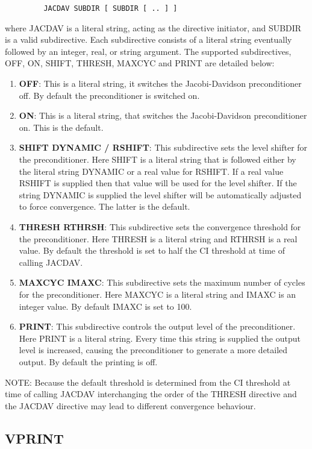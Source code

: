 \documentclass[11pt,fleqn]{article}
\begin{document}
{
\footnotesize
\begin{verbatim}
         JACDAV SUBDIR [ SUBDIR [ .. ] ]
\end{verbatim}
}
where JACDAV is a literal string, acting as the directive initiator,
and SUBDIR is a valid subdirective. Each subdirective consists of a 
literal string eventually followed by an integer, real, or string 
argument. The supported subdirectives, OFF, ON, SHIFT, THRESH, MAXCYC
and PRINT are detailed below:
\begin{enumerate}
\item  {\bf OFF}:
This is a literal string, it switches the Jacobi-Davidson preconditioner
off. By default the preconditioner is switched on. 
\item  {\bf ON}:
This is a literal string, that switches the Jacobi-Davidson
preconditioner on. This is the default. 
\item {\bf SHIFT DYNAMIC / RSHIFT}:
This subdirective sets the level shifter for the preconditioner. Here
SHIFT is a literal string that is followed either by the literal string
DYNAMIC or a real value for RSHIFT. If a real value RSHIFT is
supplied then that value will be used for the level shifter. If the string
DYNAMIC is supplied the level shifter will be automatically adjusted
to force convergence. The latter is the default.
\item  {\bf THRESH RTHRSH}:
This subdirective sets the convergence threshold for the
preconditioner. Here THRESH is a literal string and RTHRSH is a
real value. By default the threshold is set to half the CI threshold at
time of calling JACDAV. 
\item {\bf MAXCYC IMAXC}:
This subdirective sets the maximum number of cycles for the
preconditioner. Here MAXCYC is a literal string and IMAXC is an
integer value. By default IMAXC is set to 100. 
\item  {\bf PRINT}:
This subdirective controls the output level of the preconditioner. Here
PRINT is a literal string. Every time this string is supplied the output
level is increased, causing the preconditioner to generate a more
detailed output. By default the printing is off. 
\end{enumerate}
NOTE: Because the default threshold is determined from the CI threshold at time of
calling JACDAV interchanging the order of the THRESH directive and the
JACDAV directive may lead to different convergence behaviour. 

\subsection[VPRINT]{VPRINT}
\end{document}
